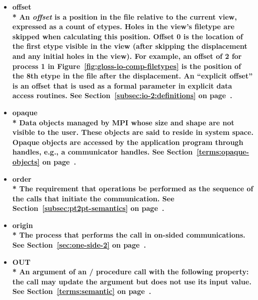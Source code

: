 \begin{itemize}
\label{glossary:offset}
\item \bf{ offset} \\* 
An {\it offset} is a position
in the file
relative to the current view,
expressed as a count of etypes.
Holes in the view's filetype are skipped when calculating this position.
Offset 0 is the location of the first etype visible in the view
(after skipping the displacement and any initial holes in the view).
For example, an offset of 2 for process 1
in Figure~\ref{fig:gloss-io-comp-filetypes} is the position
of the 8th etype in the file after the displacement.
An ``explicit offset'' is an offset that is used as a formal parameter
in explicit data access routines.
See Section~\ref{subsec:io-2:definitions} on page~\pageref{subsec:io-2:definitions}.

\label{glossary:opaque}
\item \bf{ opaque} \\*
Data objects managed by MPI whose size and shape are not visible to the user. These objects are said to reside in system space.
Opaque objects are accessed by the application program through {\bf handles}, e.g., a communicator handles. 
See Section~\ref{terms:opaque-objects} on page~\pageref{terms:opaque-objects}.

\label{glossary:order}
\item \bf{ order} \\*
The requirement that operations be performed as the sequence of the calls that initiate the communication.
See Section~\ref{subsec:pt2pt-semantics} on page~\pageref{subsec:pt2pt-semantics}.

\label{glossary:origin}
\item \bf{ origin} \\*
The process that performs the call in on-sided communications.
See Section~\ref{sec:one-side-2} on page~\pageref{sec:one-side-2}.

\label{glossary:OUT}
\item \bf{ OUT} \\*
An argument of an \MPI/ procedure call with the following property: the call may update the argument but does not use its input value.
See Section~\ref{terms:semantic} on page~\pageref{terms:semantic}.


\end{itemize}
